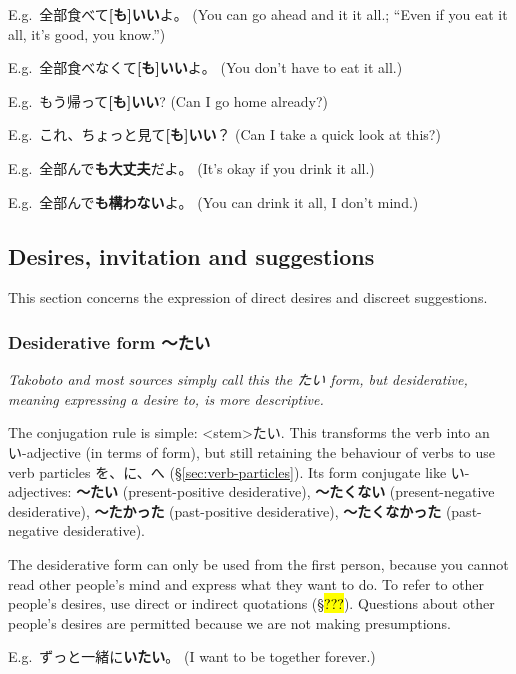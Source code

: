 \documentclass[../nihongo-gakushuu-kyouzai.tex]{subfiles}
\begin{document}
E.g.\ 全部食べて\textbf{[も]いい}よ。 (You can go ahead and it it all.; ``Even if you eat it all, it's good, you know.'')

E.g.\ 全部食べなくて\textbf{[も]いい}よ。 (You don't have to eat it all.)

E.g.\ もう帰って\textbf{[も]いい}? (Can I go home already?)

E.g.\ これ、ちょっと見て\textbf{[も]いい}？ (Can I take a quick look at this?)

E.g.\ 全部んで\textbf{も大丈夫}だよ。 (It's okay if you drink it all.)

E.g.\ 全部んで\textbf{も構わない}よ。 (You can drink it all, I don't mind.)


\subsection{Desires, invitation and suggestions} \label{sec:desires-invitation-and-suggestions}
This section concerns the expression of direct desires and discreet suggestions.


\subsubsection{Desiderative form 〜たい} \label{desiderative-form}
\emph{Takoboto and most sources simply call this the たい form, but desiderative, meaning expressing a desire to, is more descriptive.}

The conjugation rule is simple: <stem>たい. This transforms the verb into an い-adjective (in terms of form), but still retaining the behaviour of verbs to use verb particles を、に、へ (\S\ref{sec:verb-particles}). Its form conjugate like い-adjectives: \textbf{〜たい} (present-positive desiderative), \textbf{〜たくない} (present-negative desiderative), \textbf{〜たかった} (past-positive desiderative), \textbf{〜たくなかった} (past-negative desiderative).


The desiderative form can only be used from the first person, because you cannot read other people's mind and express what they want to do. To refer to other people's desires, use direct or indirect quotations (\S\hl{???}). Questions about other people's desires are permitted because we are not making presumptions.

E.g.\ ずっと一緒に\textbf{いたい}。 (I want to be together forever.)
\end{document}
